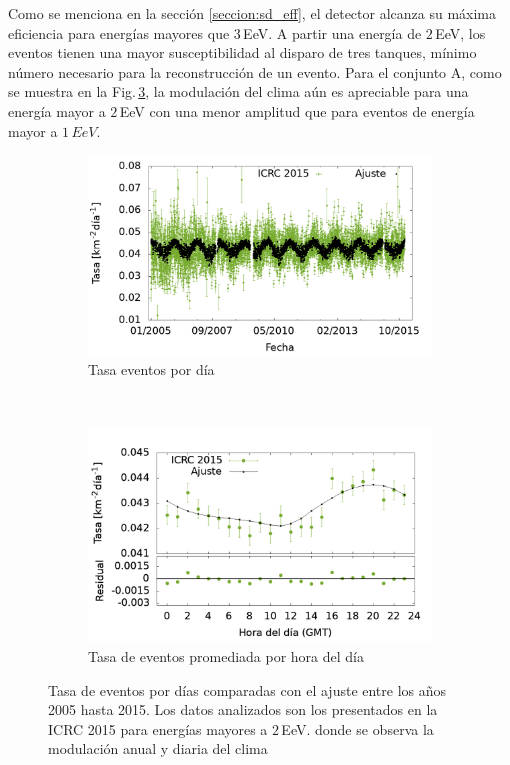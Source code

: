         Como se menciona en la sección \ref{seccion:sd_eff}, el detector alcanza su máxima eficiencia para energías mayores que 3\,EeV. A partir una energía de $2\,$EeV, los eventos tienen una mayor susceptibilidad al disparo de tres tanques, mínimo número necesario para la reconstrucción de un evento. Para el conjunto A, como se muestra en la Fig.\,\ref{fig:rate_2015_05-15_2EeV}, la modulación del clima aún es apreciable para una energía mayor a $2\,$EeV con una menor amplitud que para eventos de energía mayor a $1\,EeV$. 

        \begin{figure}[H]
            \centering
            \begin{subfigure}[b]{0.5\textwidth}
            \includegraphics[width=\textwidth]{Graphs/rate_dayly/2EeV_ICRC_2015.png}
            \caption{Tasa eventos por día}\label{fig:rate_dayly_ICRC_2015_2EeV}
            \end{subfigure}\\
            \begin{subfigure}[b]{0.5\textwidth}
            \includegraphics[width=\textwidth]{Graphs/rate_hour_of_the_day/2EeV_ICRC_2015_old_herald.png}
            \caption{Tasa de eventos promediada por hora del día }\label{fig:rate_hod_ICRC_2015_2EeV}
            \end{subfigure}%
            \caption{Tasa de eventos por días comparadas con el ajuste entre los años 2005 hasta 2015. Los datos analizados son los presentados en la ICRC 2015 para energías mayores a $2\,$EeV. donde se observa la modulación anual y diaria del clima }\label{fig:rate_2015_05-15_2EeV}
        \end{figure}

